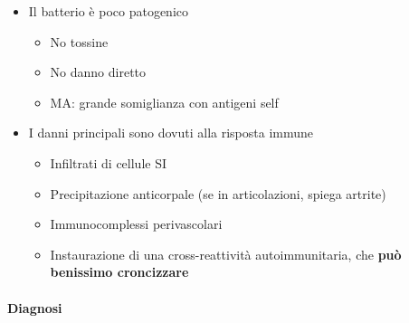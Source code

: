 \documentclass[italian,]{article}
\providecommand{\tightlist}{%
  \setlength{\itemsep}{0pt}\setlength{\parskip}{0pt}}
\begin{document}
\begin{itemize}
  \begin{itemize}
  \tightlist
  \item
    Il batterio è poco patogenico

    \begin{itemize}
    \tightlist
    \item
      No tossine
    \item
      No danno diretto
    \item
      MA: grande somiglianza con antigeni self
    \end{itemize}
  \item
    I danni principali sono dovuti alla risposta immune

    \begin{itemize}
    \tightlist
    \item
      Infiltrati di cellule SI
    \item
      Precipitazione anticorpale (se in articolazioni, spiega artrite)
    \item
      Immunocomplessi perivascolari
    \item
      Instaurazione di una cross-reattività autoimmunitaria, che
      \textbf{può benissimo croncizzare}
    \end{itemize}
  \end{itemize}
\end{itemize}

\hypertarget{diagnosi-1}{%
\paragraph{Diagnosi}\label{diagnosi-1}}
\end{document}
